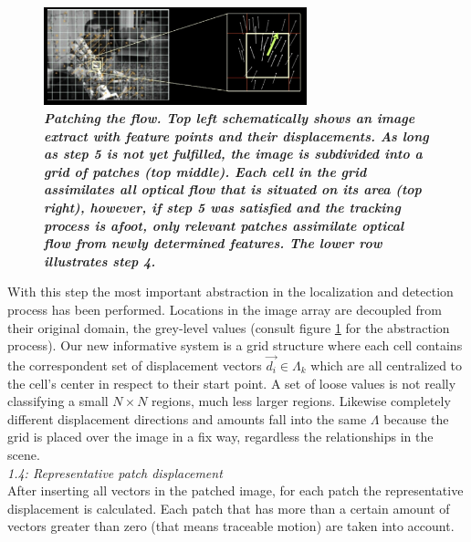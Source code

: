 \begin{figure}
	\begin{center}
		\includegraphics[width=3in]{imgs/method/step1to4.ps}
		\caption[Patching the flow. ]{\textbf{\textit{Patching the flow. Top left schematically shows an image extract with feature points and their displacements. As long as step 5 is not yet fulfilled, the image is subdivided into a grid of patches (top middle). Each cell in the grid assimilates all optical flow that is situated on its area (top right), however, if step 5 was satisfied and the tracking process is afoot, only relevant patches assimilate optical flow from newly determined features. The lower row illustrates step 4. }}}
		\label{fig:abstraction}
	\end{center}
\end{figure}
%
With this step the most important abstraction in the localization and detection process has been performed. Locations in the image array are decoupled from their original domain, the grey-level values (consult figure \ref{fig:abstraction} for the abstraction process). Our new informative system is a grid structure where each cell contains the correspondent set of displacement vectors $ \vec{d_i} \in \Lambda_k $ which are all centralized to the cell's center in respect to their start point. A set of loose values is not really classifying a small $ N \times N $ regions, much less larger regions. Likewise completely different displacement directions and amounts fall into the same $ \Lambda $ because the grid is placed over the image in a fix way, regardless the relationships in the scene.\\ \newline
%
\textit{1.4: Representative patch displacement} \\ \newline
After inserting all vectors in the patched image, for each patch the representative displacement is calculated. Each patch that has more than a certain amount of vectors greater than zero (that means traceable motion) are taken into account.
